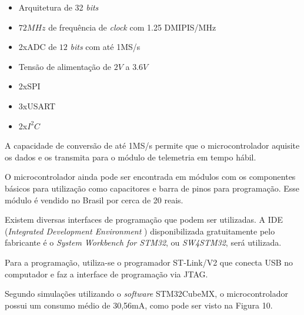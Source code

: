 \documentclass[
	12pt,				%
	openright,			%
	twoside,			%
	a4paper,			%
	english,			%
	french,				%
	spanish,			%
	brazil,				%
	]{abntex2}
\begin{document}
			\begin{itemize}
				\item Arquitetura de 32 \textit{bits}
				\item $72MHz$ de frequência de \textit{clock} com 1.25 DMIPIS/MHz
				\item 2xADC de $12$ \textit{bits} com até 1MS/s
				\item Tensão de alimentação de $2V$ a $3.6V$
				\item 2xSPI
				\item 3xUSART
				\item 2x$I^2C$
			\end{itemize}

			A capacidade de conversão de até 1MS/s permite que o
			microcontrolador aquisite os dados e os transmita para o módulo
			de telemetria em tempo hábil.
			
			O microcontrolador ainda pode ser encontrada em módulos com os
			componentes básicos para utilização como capacitores e barra de
			pinos para programação. Esse módulo é vendido no Brasil por
			cerca de 20 reais.

			Existem diversas interfaces de programação que podem ser
			utilizadas. A IDE (\textit{Integrated Development Environment })
			disponibilizada gratuitamente pelo fabricante é o \textit{System
			Workbench for STM32}, ou \textit{SW4STM32}, será utilizada.

			Para a programação, utiliza-se o programador ST-Link/V2 que
			conecta USB no computador e faz a interface de programação via
			JTAG.

			Segundo simulações utilizando o \textit{software} STM32CubeMX, o
			microcontrolador possui um consumo médio de 30,56mA, como pode ser
			visto na Figura 10.
\end{document}
